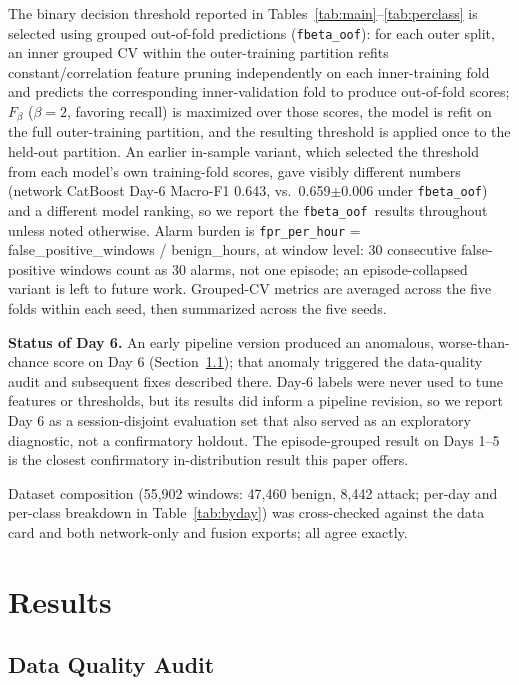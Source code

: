 \documentclass[conference]{IEEEtran}
\newcommand{\fbetaoof}{\texttt{fbeta\_oof}}
\begin{document}
The binary decision threshold reported in Tables~\ref{tab:main}--\ref{tab:perclass} is selected using
grouped out-of-fold predictions (\fbetaoof): for each outer split, an inner grouped CV within the
outer-training partition refits constant/correlation feature pruning independently on each
inner-training fold and predicts the corresponding inner-validation fold to produce out-of-fold scores;
$F_\beta$ ($\beta=2$, favoring recall) is maximized over those scores, the model is refit on the full
outer-training partition, and the resulting threshold is applied once to the held-out partition. An
earlier in-sample variant, which selected the threshold from each model's own training-fold scores, gave
visibly different numbers (network CatBoost Day-6 Macro-F1 0.643, vs.\ 0.659$\pm$0.006 under
\fbetaoof) and a different model ranking, so we report the \fbetaoof\ results throughout unless noted
otherwise. Alarm burden is \texttt{fpr\_per\_hour} = false\_positive\_windows / benign\_hours, at window
level: 30 consecutive false-positive windows count as 30 alarms, not one episode; an episode-collapsed
variant is left to future work. Grouped-CV metrics are averaged across the five folds within each seed,
then summarized across the five seeds.

\textbf{Status of Day 6.} An early pipeline version produced an anomalous, worse-than-chance score on Day
6 (Section~\ref{sec:audit}); that anomaly triggered the data-quality audit and subsequent fixes described
there. Day-6 labels were never used to tune features or thresholds, but its results did inform a pipeline
revision, so we report Day 6 as a session-disjoint evaluation set that also served as an exploratory
diagnostic, not a confirmatory holdout. The episode-grouped result on Days 1--5 is the closest
confirmatory in-distribution result this paper offers.

Dataset composition (55{,}902 windows: 47{,}460 benign, 8{,}442 attack; per-day and per-class breakdown in
Table~\ref{tab:byday}) was cross-checked against the data card and both network-only and fusion exports;
all agree exactly.

\section{Results}

\subsection{Data Quality Audit}
\label{sec:audit}
\end{document}
